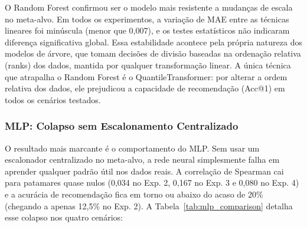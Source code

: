 \documentclass[12pt]{article}
\begin{document}
O Random Forest confirmou ser o modelo mais resistente a mudanças de escala no meta-alvo. Em todos os experimentos, a variação de MAE entre as técnicas lineares foi minúscula (menor que 0,007), e os testes estatísticos não indicaram diferença significativa global. Essa estabilidade acontece pela própria natureza dos modelos de árvore, que tomam decisões de divisão baseadas na ordenação relativa (ranks) dos dados, mantida por qualquer transformação linear. A única técnica que atrapalha o Random Forest é o QuantileTransformer: por alterar a ordem relativa dos dados, ele prejudicou a capacidade de recomendação (Acc@1) em todos os cenários testados.

\subsubsection{MLP: Colapso sem Escalonamento Centralizado}
\label{subsec:analise_mlp}

O resultado mais marcante é o comportamento do MLP. Sem usar um escalonador centralizado no meta-alvo, a rede neural simplesmente falha em aprender qualquer padrão útil nos dados reais. A correlação de Spearman cai para patamares quase nulos (0,034 no Exp. 2, 0,167 no Exp. 3 e 0,080 no Exp. 4) e a acurácia de recomendação fica em torno ou abaixo do acaso de 20\% (chegando a apenas 12,5\% no Exp. 2). A Tabela~\ref{tab:mlp_comparison} detalha esse colapso nos quatro cenários:
\end{document}
